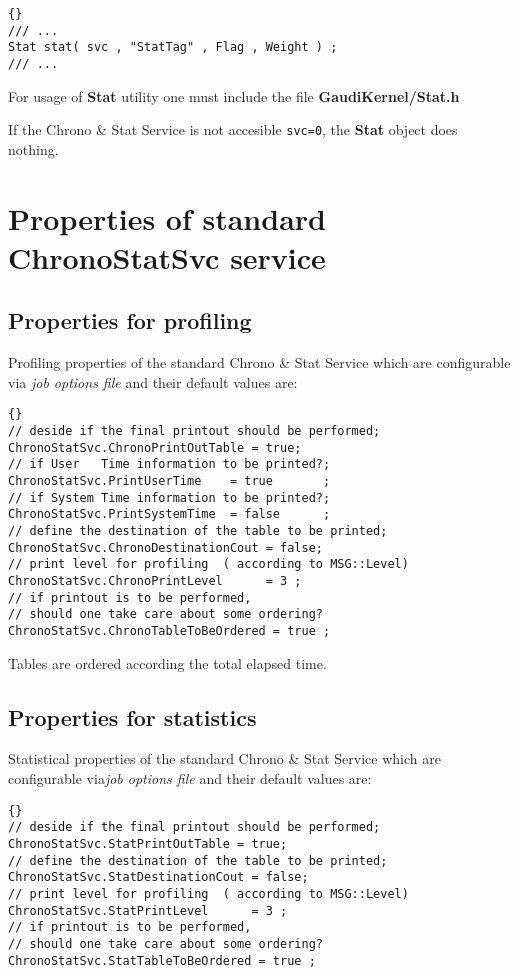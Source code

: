 \documentclass{lhcbnote}
\newcommand{\bftt}         {\ttfamily\bfseries}
\renewcommand{\it}         {\itshape}
\begin{document}
\begin{lstlisting}{}
/// ... 
Stat stat( svc , "StatTag" , Flag , Weight ) ;
/// ...  
\end{lstlisting} 

For usage of {\bftt{Stat}} utility one must include the file 
{\bftt{GaudiKernel/Stat.h}}

If the Chrono \& Stat Service  is not accesible \verb+svc=0+,
the {\bftt{Stat}} object does nothing.

\chapter{Properties of standard {\bftt{ChronoStatSvc}} service }
   
\section{Properties for profiling  } 
Profiling properties of the standard Chrono \& Stat Service 
which are configurable via {\it job options file} and their 
default values are:

\begin{lstlisting}{} 
// deside if the final printout should be performed;  
ChronoStatSvc.ChronoPrintOutTable = true; 
// if User   Time information to be printed?;
ChronoStatSvc.PrintUserTime    = true       ; 
// if System Time information to be printed?;
ChronoStatSvc.PrintSystemTime  = false      ;
// define the destination of the table to be printed;
ChronoStatSvc.ChronoDestinationCout = false;
// print level for profiling  ( according to MSG::Level)  
ChronoStatSvc.ChronoPrintLevel      = 3 ; 
// if printout is to be performed, 
// should one take care about some ordering?  
ChronoStatSvc.ChronoTableToBeOrdered = true ;
\end{lstlisting}
 
Tables are ordered according the total elapsed time. 

\section{Properties for statistics } 
Statistical properties of the standard Chrono \& Stat Service 
which are configurable via{\it job options file} and their default values 
are:

\begin{lstlisting}{} 
// deside if the final printout should be performed;  
ChronoStatSvc.StatPrintOutTable = true; 
// define the destination of the table to be printed;
ChronoStatSvc.StatDestinationCout = false;
// print level for profiling  ( according to MSG::Level)  
ChronoStatSvc.StatPrintLevel      = 3 ; 
// if printout is to be performed, 
// should one take care about some ordering?  
ChronoStatSvc.StatTableToBeOrdered = true ;
\end{lstlisting}
\end{document}
